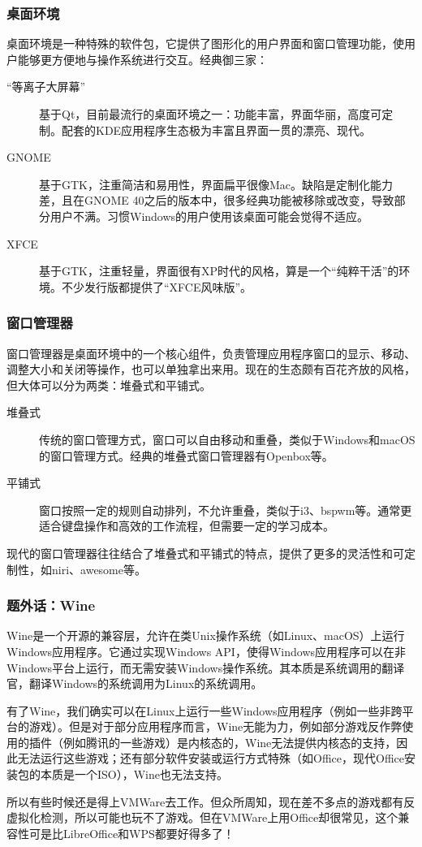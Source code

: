 \documentclass[aspectratio=1610]{ctexbeamer}
\begin{document}
\begin{frame}
  \frametitle{桌面环境}

  桌面环境是一种特殊的软件包，它提供了图形化的用户界面和窗口管理功能，使用户能够更方便地与操作系统进行交互。经典御三家：
  \begin{description}
    \item[“等离子大屏幕”] 基于Qt，目前最流行的桌面环境之一：功能丰富，界面华丽，高度可定制。配套的KDE应用程序生态极为丰富且界面一贯的漂亮、现代。
    \item[GNOME] 基于GTK，注重简洁和易用性，界面扁平很像Mac。缺陷是定制化能力差，且在GNOME 40之后的版本中，很多经典功能被移除或改变，导致部分用户不满。习惯Windows的用户使用该桌面可能会觉得不适应。
    \item[XFCE] 基于GTK，注重轻量，界面很有XP时代的风格，算是一个“纯粹干活”的环境。不少发行版都提供了“XFCE风味版”。
  \end{description}
\end{frame}

\begin{frame}
  \frametitle{窗口管理器}

  窗口管理器是桌面环境中的一个核心组件，负责管理应用程序窗口的显示、移动、调整大小和关闭等操作，也可以单独拿出来用。现在的生态颇有百花齐放的风格，但大体可以分为两类：堆叠式和平铺式。
  \begin{description}
    \item[堆叠式] 传统的窗口管理方式，窗口可以自由移动和重叠，类似于Windows和macOS的窗口管理方式。经典的堆叠式窗口管理器有Openbox等。
    \item[平铺式] 窗口按照一定的规则自动排列，不允许重叠，类似于i3、bspwm等。通常更适合键盘操作和高效的工作流程，但需要一定的学习成本。
  \end{description}
  现代的窗口管理器往往结合了堆叠式和平铺式的特点，提供了更多的灵活性和可定制性，如niri、awesome等。

\end{frame}

\begin{frame}
  \frametitle{题外话：Wine}

  Wine是一个开源的兼容层，允许在类Unix操作系统（如Linux、macOS）上运行Windows应用程序。它通过实现Windows API，使得Windows应用程序可以在非Windows平台上运行，而无需安装Windows操作系统。其本质是系统调用的翻译官，翻译Windows的系统调用为Linux的系统调用。
  
  有了Wine，我们确实可以在Linux上运行一些Windows应用程序（例如一些非跨平台的游戏）。但是对于部分应用程序而言，Wine无能为力，例如部分游戏反作弊使用的插件（例如腾讯的一些游戏）是内核态的，Wine无法提供内核态的支持，因此无法运行这些游戏；还有部分软件安装或运行方式特殊（如Office，现代Office安装包的本质是一个ISO），Wine也无法支持。

  所以有些时候还是得上VMWare去工作。但众所周知，现在差不多点的游戏都有反虚拟化检测，所以可能也玩不了游戏。但在VMWare上用Office却很常见，这个兼容性可是比LibreOffice和WPS都要好得多了！

\end{frame}
\end{document}
